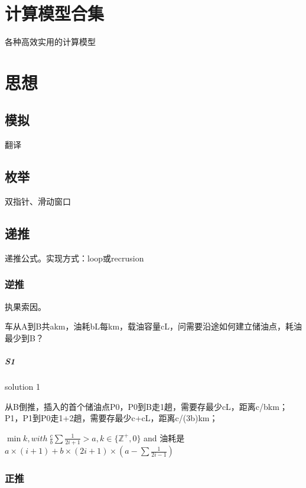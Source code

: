 \documentclass[UTF8]{../computerUniverse}
\begin{document}
\chapter{计算模型合集}
各种高效实用的计算模型







\chapter{思想}



\section{模拟}
翻译

\section{枚举}
双指针、滑动窗口


\section{递推}
递推公式。实现方式：loop或recrusion


\subsection{逆推}
执果索因。


\begin{question}
 车从A到B共akm，油耗bL每km，载油容量cL，问需要沿途如何建立储油点，耗油最少到B？

  \paragraph{S1} solution 1

  从B倒推，插入的首个储油点P0，P0到B走1趟，需要存最少cL，距离c/bkm；
  P1，P1到P0走1+2趟，需要存最少c+cL，距离c/(3b)km；



  $\min k, with \ \frac{c}{b}\sum\frac{1}{2i+1} > a, k\in \{ \mathbb{Z} ^+, 0\}$ and 油耗是$a \times (i+1) + b \times(2i+1) \times (a - \sum\frac{1}{2i-1})$

\end{question}

\subsection{正推}
\end{document}
